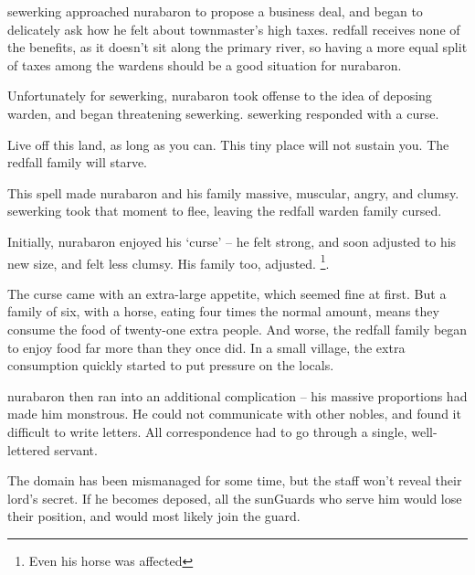 \label{desperatemeasures}

\begin{exampletext}
  \Gls{sewerking} approached \gls{nurabaron} to propose a business deal, and began to delicately ask how he felt about \gls{townmaster}'s high taxes.
  \Gls{redfall} receives none of the benefits, as it doesn't sit along the primary river, so having a more equal split of taxes among the \glspl{warden} should be a good situation for \gls{nurabaron}.

  Unfortunately for \gls{sewerking}, \gls{nurabaron} took offense to the idea of deposing \gls{warden}, and began threatening \gls{sewerking}.
  \Gls{sewerking} responded with a curse.

  \begin{speechtext}
    Live off this land, as long as you can.
    This tiny place will not sustain you.
    The \gls{redfall} family will starve.

  \end{speechtext}
  This spell made \gls{nurabaron} and his family massive, muscular, angry, and clumsy.
  \Gls{sewerking} took that moment to flee, leaving the \gls{redfall} \gls{warden} family cursed.

  Initially, \gls{nurabaron} enjoyed his `curse' -- he felt strong, and soon adjusted to his new size, and felt less clumsy.
  His family too, adjusted.%
  \footnote{Even his horse was affected}.

  The curse came with an extra-large appetite, which seemed fine at first.
  But a family of six, with a horse, eating four times the normal amount, means they consume the food of twenty-one extra people.
  And worse, the \gls{redfall} family began to enjoy food far more than they once did.
  In a small \gls{village}, the extra consumption quickly started to put pressure on the locals.

  \Gls{nurabaron} then ran into an additional complication -- his massive proportions had made him monstrous.
  He could not communicate with other nobles, and found it difficult to write letters.
  All correspondence had to go through a single, well-lettered servant.

  The domain has been mismanaged for some time, but the staff won't reveal their lord's secret.
  If he becomes deposed, all the \glspl{sunGuard} who serve him would lose their position, and would most likely join the \gls{guard}.
\end{exampletext}

